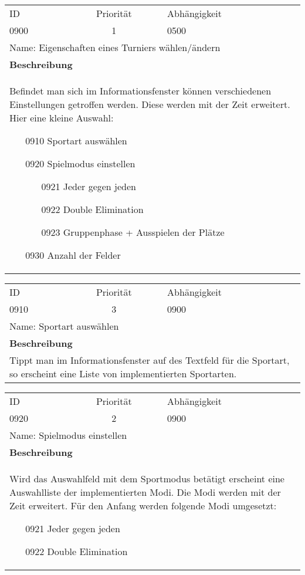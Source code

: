 	\begin{tabularx}{\textwidth}{|l|c|l|}
		\hline
		ID & Priorität & Abhängigkeit \\
		0900 & 1 & 0500\\
		\hline
		\multicolumn{3}{|l|}{Name: Eigenschaften eines Turniers wählen/ändern} \\
		\hline
		\multicolumn{3}{|l|}{\textbf{Beschreibung}}\\
		\multicolumn{3}{|X|}{Befindet man sich im Informationsfenster können verschiedenen Einstellungen getroffen werden. Diese werden mit der Zeit erweitert. Hier eine kleine Auswahl:
		\begin{itemize}
			\item[0910] Sportart auswählen
			\item[0920] Spielmodus einstellen
			\begin{itemize}
				\item[0921] Jeder gegen jeden
				\item[0922] Double Elimination
				\item[0923] Gruppenphase + Ausspielen der Plätze 
			\end{itemize}
			\item[0930] Anzahl der Felder
		\end{itemize}
		}\\
		
		\hline		 
	\end{tabularx}
	
	\begin{tabularx}{\textwidth}{|l|c|l|}
		\hline
		ID & Priorität & Abhängigkeit \\
		0910 & 3 & 0900\\
		\hline
		\multicolumn{3}{|l|}{Name: Sportart auswählen} \\
		\hline
		\multicolumn{3}{|l|}{\textbf{Beschreibung}}\\
		\multicolumn{3}{|X|}{Tippt man im Informationsfenster auf des Textfeld für die Sportart, so erscheint eine Liste von implementierten Sportarten.}\\
		\hline		 
	\end{tabularx}
	
	\begin{tabularx}{\textwidth}{|l|c|l|}
		\hline
		ID & Priorität & Abhängigkeit \\
		0920 & 2 & 0900\\
		\hline
		\multicolumn{3}{|l|}{Name: Spielmodus einstellen} \\
		\hline
		\multicolumn{3}{|l|}{\textbf{Beschreibung}}\\
		\multicolumn{3}{|X|}{Wird das Auswahlfeld mit dem Sportmodus betätigt erscheint eine Auswahlliste der implementierten Modi. Die Modi werden mit der Zeit erweitert. Für den Anfang werden folgende Modi umgesetzt:
		\begin{itemize}
				\item[0921] Jeder gegen jeden
				\item[0922] Double Elimination 
			\end{itemize}}\\
		\hline		 
	\end{tabularx}
	
